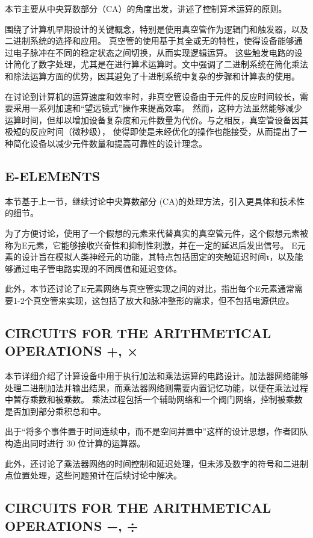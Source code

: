 \documentclass[12pt]{article} %
\theoremstyle{definition}
\begin{document}
本节主要从中央算数部分（CA）的角度出发，讲述了控制算术运算的原则。

围绕了计算机早期设计的关键概念，特别是使用真空管作为逻辑门和触发器，以及二进制系统的选择和应用。
真空管的使用基于其全或无的特性，使得设备能够通过电子脉冲在不同的稳定状态之间切换，从而实现逻辑运算。
这些触发电路的设计简化了数字处理，尤其是在进行算术运算时。文中强调了二进制系统在简化乘法和除法运算方面的优势，因其避免了十进制系统中复杂的步骤和计算表的使用。

在讨论到计算机的运算速度和效率时，非真空管设备由于元件的反应时间较长，需要采用一系列加速和“望远镜式”操作来提高效率。
然而，这种方法虽然能够减少运算时间，但却以增加设备复杂度和元件数量为代价。与之相反，真空管设备因其极短的反应时间（微秒级），
使得即使是未经优化的操作也能接受，从而提出了一种简化设备以减少元件数量和提高可靠性的设计理念。

\subsection{E-ELEMENTS}

本节基于上一节，继续讨论中央算数部分 (CA)的处理方法，引入更具体和技术性的细节。

为了方便讨论，使用了一个假想的元素来代替真实的真空管元件，这个假想元素被称为E元素，它能够接收兴奋性和抑制性刺激，并在一定的延迟后发出信号。
E元素的设计旨在模拟人类神经元的功能，其特点包括固定的突触延迟时间τ，以及能够通过电子管电路实现的不同阈值和延迟变体。

此外，本节还讨论了E元素网络与真空管实现之间的对比，指出每个E元素通常需要1-2个真空管来实现，这包括了放大和脉冲整形的需求，但不包括电源供应。

\subsection{CIRCUITS FOR THE ARITHMETICAL OPERATIONS +, ×}

本节详细介绍了计算设备中用于执行加法和乘法运算的电路设计。加法器网络能够处理二进制加法并输出结果，而乘法器网络则需要内置记忆功能，以便在乘法过程中暂存乘数和被乘数。
乘法过程包括一个辅助网络和一个阀门网络，控制被乘数是否加到部分乘积总和中。

出于“将多个事件置于时间连续中，而不是空间并置中”这样的设计思想，作者团队构造出同时进行 30 位计算的运算器。

此外，还讨论了乘法器网络的时间控制和延迟处理，但未涉及数字的符号和二进制点位置处理，这些问题预计在后续讨论中解决。

\subsection{CIRCUITS FOR THE ARITHMETICAL OPERATIONS −, ÷}
\end{document}
